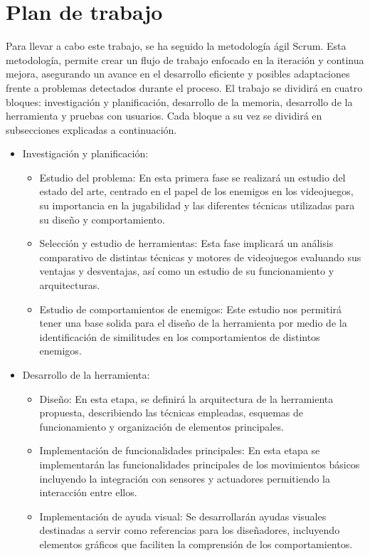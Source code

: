 \section{Plan de trabajo}
Para llevar a cabo este trabajo, se ha seguido la metodología ágil Scrum. Esta metodología, permite crear un flujo de trabajo enfocado en la iteración y continua mejora, asegurando un avance en el desarrollo eficiente y posibles adaptaciones frente a problemas detectados durante el proceso. 
El trabajo se dividirá en cuatro bloques: investigación y planificación, desarrollo de la memoria, desarrollo de la herramienta y pruebas con usuarios.
Cada bloque a su vez se dividirá en subsecciones explicadas a continuación.
\begin{itemize}
   \item  Investigación y planificación:
	\begin{itemize}
	    \item  Estudio del problema: En esta primera fase se realizará un estudio del estado del arte, centrado en el papel de los enemigos en los videojuegos, su importancia en la jugabilidad y las diferentes técnicas utilizadas para su diseño y comportamiento.
	    \item Selección y estudio de herramientas: Esta fase implicará un análisis comparativo de distintas técnicas y motores de videojuegos evaluando sus ventajas y desventajas, así como un estudio de su funcionamiento y  arquitecturas.
	    \item Estudio de comportamientos de enemigos: Este estudio nos permitirá tener una base solida para el diseño de la herramienta por medio de la identificación de similitudes en los comportamientos de distintos enemigos. 
	\end{itemize}
   \item Desarrollo de la herramienta: 
	\begin{itemize}
	    \item Diseño: En esta etapa, se definirá la arquitectura de la herramienta propuesta, describiendo las técnicas empleadas, esquemas de funcionamiento y organización de elementos principales.
	    \item  Implementación de funcionalidades principales: En esta etapa se implementarán las funcionalidades principales de los movimientos básicos incluyendo la integración con sensores y actuadores permitiendo la interacción entre ellos.
	    \item Implementación de ayuda visual: Se desarrollarán ayudas visuales destinadas a servir como referencias para los diseñadores, incluyendo elementos gráficos que faciliten la comprensión de los comportamientos. 

\end{itemize}
\end{itemize}
